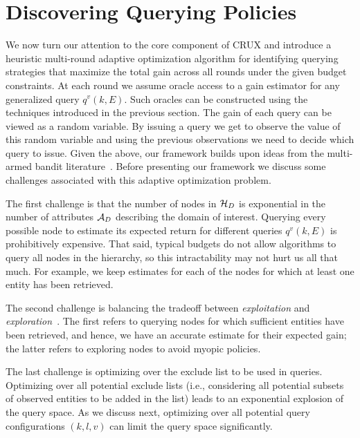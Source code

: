 

\section{Discovering Querying Policies}
\label{sec:solving}
We now turn our attention to the core component of CRUX and introduce a heuristic multi-round adaptive optimization algorithm for identifying querying strategies that maximize the total gain across all rounds under the given budget constraints. At each round we assume oracle access to a gain estimator for any generalized query $q^v(k,E)$. Such oracles can be constructed using the techniques introduced in the previous section. The gain of each query can be viewed as a random variable. By issuing a query we get to observe the value of this random variable and using the previous observations we need to decide which query to issue. Given the above, our framework builds upon ideas from the multi-armed bandit literature~\cite{Auer:2003,EvenDar06actionelimination}. Before presenting our framework we discuss some challenges associated with this adaptive optimization problem.

\squishlist
\item The first challenge is that the number of nodes in $\mathcal{H}_D$ is exponential in the number of attributes $\mathcal{A}_D$ describing the domain of interest. Querying every possible node to estimate its expected return for different queries $q^v(k,E)$ is prohibitively expensive. That said, typical budgets do not allow algorithms to query all nodes in the hierarchy, so this intractability may not hurt us all that much. For example, we keep estimates for each of the nodes for which at least one entity has been retrieved.
\item The second challenge is balancing the tradeoff between {\em exploitation} and {\em exploration}~\cite{Auer:2003}. The first refers to querying nodes for which sufficient entities have been retrieved, and hence, we have an accurate estimate for their expected gain; the latter refers to exploring nodes to avoid myopic policies.
\item The last challenge is optimizing over the exclude list to be used in queries. Optimizing over all potential exclude lists (i.e., considering all potential subsets of observed entities to be added in the list) leads to an exponential explosion of the query space. As we discuss next, optimizing over all potential query configurations $(k,l,v)$ can limit the query space significantly.
\squishend

